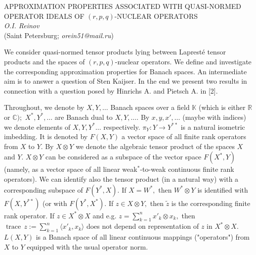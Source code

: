 

\begin{center}{APPROXIMATION PROPERTIES ASSOCIATED WITH QUASI-NORMED OPERATOR IDEALS OF
$(r,p,q)$-NUCLEAR OPERATORS}\\
{\it O.I. Reinov}\\
(Saint Petersburg;  {\it orein51@mail.ru})
\end{center}



We consider quasi-normed tensor products lying between
Laprest\'e tensor products and the spaces of $(r,p,q)$-nuclear ope\-rators.
We define and investigate the corresponding approxima\-tion pro\-per\-ties for Banach spaces.
An intermediate aim is to answer a question of Sten Kaijser.  In the end we present two results in connection with
a question posed by  Hinrichs A. and Pietsch A. in [2].

Throughout, we denote by $X,Y, \dots$ Banach spaces over a field $\mathbb K$
(which is either $\mathbb R$ or $\mathbb C);$ $X^*, Y^*,\dots$ are
Banach dual to $X, Y, \dots.$ By $x, y, x',\dots$ (maybe with indices) we denote elements of
$X, Y,  Y^*\dots$ respectively. $\pi_Y: Y\to Y^{**}$ is a natural isometric imbedding.
It is denoted by $F(X,Y)$ a vector space of all finite rank operators
from $X$ to $Y.$ By $X\otimes Y$ we denote the algebraic tensor product of the spaces
$X$ and $Y.$
  $X\otimes Y$ can be considered as a subspace of the vector space $F(X^*, Y)$
(namely, as a vector space of all linear weak${^*}$-to-weak continuous
finite rank operators). We can identify also the tensor product (in a natural way)
with a corresponding subspace of $F(Y^*,X).$ If $X=W^*,$ then
$W^*\otimes Y$ is identified with $F(X,Y^{**})$ (or with $F(Y^*,X^*).$
If $z\in X\otimes Y,$ then $\widetilde z$ is the corresponding finite rank operator.
If $z\in X^*\otimes X$ and e.g. $z=\sum_{k=1}^n x'_k\otimes x_k,$ then
   $\operatorname{trace}\, z:= \sum_{k=1}^n \langle x'_k, x_k\rangle$ does not depend on representation
   of $z$ in $X^*\otimes X.$
 $L(X,Y)$ is a Banach space of all linear continuous mappings ("operators")
 from $X$ to $Y$ equipped with the usual operator norm.


